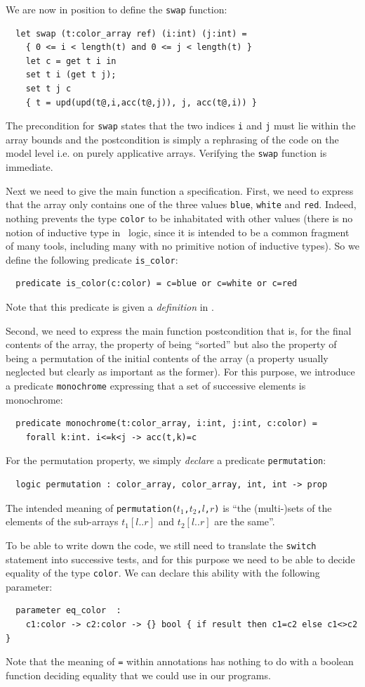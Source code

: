 \documentclass[a4paper,12pt]{report}
\begin{document}
We are now in position to define the \texttt{swap} function:
\begin{verbatim}
  let swap (t:color_array ref) (i:int) (j:int) =
    { 0 <= i < length(t) and 0 <= j < length(t) }
    let c = get t i in
    set t i (get t j);
    set t j c
    { t = upd(upd(t@,i,acc(t@,j)), j, acc(t@,i)) }
\end{verbatim}
The precondition for \texttt{swap} states that the two indices
\texttt{i} and \texttt{j} must lie within the array bounds and
the postcondition is simply a rephrasing of the code on the model
level i.e. on purely applicative arrays. Verifying the \texttt{swap}
function is immediate.

Next we need to give the main function a specification. First, we need
to express that the array only contains one of the three values
\texttt{blue}, \texttt{white} and \texttt{red}. Indeed, nothing
prevents the type \texttt{color} to be inhabitated with other values
(there is no notion of inductive type in \why\ logic, since it is
intended to be a common fragment of many tools, including many with no
primitive notion of inductive types). So we define the following predicate
\texttt{is\_color}:
\begin{verbatim}
  predicate is_color(c:color) = c=blue or c=white or c=red
\end{verbatim}
Note that this predicate is given a \emph{definition} in \why. 

Second, we need to express the main function postcondition that is,
for the final contents of the array,
the property of being ``sorted'' but also the property of being a
permutation of the initial contents of the array (a property usually
neglected but clearly as important as the former). For this purpose,
we introduce a predicate \texttt{monochrome} expressing that a set of 
successive elements is monochrome:
\begin{verbatim}
  predicate monochrome(t:color_array, i:int, j:int, c:color) =
    forall k:int. i<=k<j -> acc(t,k)=c
\end{verbatim}
For the permutation property, we simply \emph{declare} a predicate
\texttt{permutation}:
\begin{verbatim}
  logic permutation : color_array, color_array, int, int -> prop
\end{verbatim}
The intended meaning of \texttt{permutation($t_1$,$t_2$,$l$,$r$)} is
``the (multi-)sets of the elements of the sub-arrays $t_1[l..r]$ and
$t_2[l..r]$ are the same''. 

To be able to write down the code, we still need to translate the
\texttt{switch} statement into successive tests, and for this purpose
we need to be able to decide equality of the type \texttt{color}.
We can declare this ability with the following parameter:
\begin{verbatim}
  parameter eq_color  : 
    c1:color -> c2:color -> {} bool { if result then c1=c2 else c1<>c2 }
\end{verbatim}
Note that the meaning of \texttt{=} within annotations has nothing to
do with a boolean function deciding equality that we could use in
our programs.
\end{document}
